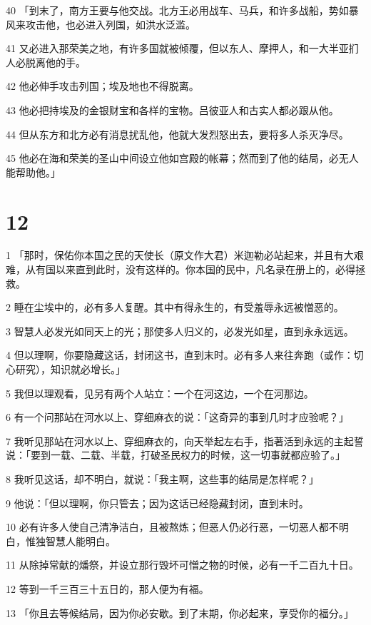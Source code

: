 \par 40 「到末了，南方王要与他交战。北方王必用战车、马兵，和许多战船，势如暴风来攻击他，也必进入列国，如洪水泛滥。
\par 41 又必进入那荣美之地，有许多国就被倾覆，但以东人、摩押人，和一大半亚扪人必脱离他的手。
\par 42 他必伸手攻击列国；埃及地也不得脱离。
\par 43 他必把持埃及的金银财宝和各样的宝物。吕彼亚人和古实人都必跟从他。
\par 44 但从东方和北方必有消息扰乱他，他就大发烈怒出去，要将多人杀灭净尽。
\par 45 他必在海和荣美的圣山中间设立他如宫殿的帐幕；然而到了他的结局，必无人能帮助他。」

\chapter{12}

\par 1 「那时，保佑你本国之民的天使长（原文作大君）米迦勒必站起来，并且有大艰难，从有国以来直到此时，没有这样的。你本国的民中，凡名录在册上的，必得拯救。
\par 2 睡在尘埃中的，必有多人复醒。其中有得永生的，有受羞辱永远被憎恶的。
\par 3 智慧人必发光如同天上的光；那使多人归义的，必发光如星，直到永永远远。
\par 4 但以理啊，你要隐藏这话，封闭这书，直到末时。必有多人来往奔跑（或作：切心研究），知识就必增长。」
\par 5 我但以理观看，见另有两个人站立：一个在河这边，一个在河那边。
\par 6 有一个问那站在河水以上、穿细麻衣的说：「这奇异的事到几时才应验呢？」
\par 7 我听见那站在河水以上、穿细麻衣的，向天举起左右手，指著活到永远的主起誓说：「要到一载、二载、半载，打破圣民权力的时候，这一切事就都应验了。」
\par 8 我听见这话，却不明白，就说：「我主啊，这些事的结局是怎样呢？」
\par 9 他说：「但以理啊，你只管去；因为这话已经隐藏封闭，直到末时。
\par 10 必有许多人使自己清净洁白，且被熬炼；但恶人仍必行恶，一切恶人都不明白，惟独智慧人能明白。
\par 11 从除掉常献的燔祭，并设立那行毁坏可憎之物的时候，必有一千二百九十日。
\par 12 等到一千三百三十五日的，那人便为有福。
\par 13 「你且去等候结局，因为你必安歇。到了末期，你必起来，享受你的福分。」


